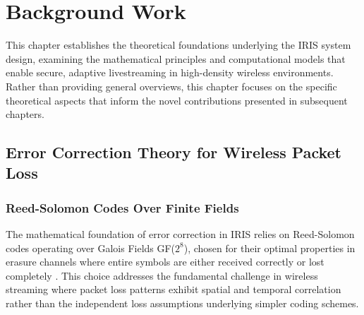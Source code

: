 
\chapter{Background Work}


\label{BackgroundWork}


This chapter establishes the theoretical foundations underlying the IRIS system design, examining the mathematical principles and computational models that enable secure, adaptive livestreaming in high-density wireless environments. Rather than providing general overviews, this chapter focuses on the specific theoretical aspects that inform the novel contributions presented in subsequent chapters.

\section{Error Correction Theory for Wireless Packet Loss}

\subsection{Reed-Solomon Codes Over Finite Fields}

The mathematical foundation of error correction in IRIS relies on Reed-Solomon codes operating over Galois Fields GF($2^8$), chosen for their optimal properties in erasure channels where entire symbols are either received correctly or lost completely \cite{reed1960polynomial}. This choice addresses the fundamental challenge in wireless streaming where packet loss patterns exhibit spatial and temporal correlation rather than the independent loss assumptions underlying simpler coding schemes.

